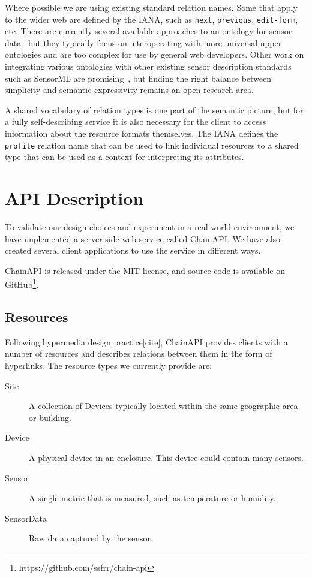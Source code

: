 \documentclass{acm_proc_article-sp}
\begin{document}
Where possible we are using existing standard relation names. Some that apply
to the wider web are defined by the IANA, such as \texttt{next},
\texttt{previous}, \texttt{edit-form}, etc. There are currently several
available approaches to an ontology for sensor
data~\cite{w3contology}\cite{broring2011}\cite{eid2007} but they typically
focus on interoperating with more universal upper ontologies and are too
complex for use by general web developers. Other work on integrating various
ontologies with other existing sensor description standards such as SensorML
are promising~\cite{russomanno2005}, but finding the right balance between
simplicity and semantic expressivity remains an open research area.

A shared vocabulary of relation types is one part of the semantic picture, but
for a fully self-describing service it is also necessary for the client to
access information about the resource formats themselves. The IANA defines the
\texttt{profile} relation name that can be used to link individual resources to
a shared type that can be used as a context for interpreting its attributes.

\section{API Description}

To validate our design choices and experiment in a real-world environment, we
have implemented a server-side web service called ChainAPI. We have also
created several client applications to use the service in different ways.

ChainAPI is released under the MIT license, and source code is available on
GitHub\footnote{https://github.com/ssfrr/chain-api}.

\subsection{Resources}
\label{api_resources}

Following hypermedia design practice[cite], ChainAPI provides clients with a
number of resources and describes relations between them in the form of
hyperlinks. The resource types we currently provide are:

\begin{description}
    \item[Site] A collection of Devices typically located within the same
        geographic area or building.
    \item[Device] A physical device in an enclosure. This device could contain
        many sensors.
    \item[Sensor] A single metric that is measured, such as temperature or humidity.
    \item[SensorData] Raw data captured by the sensor.
\end{description}
\end{document}
